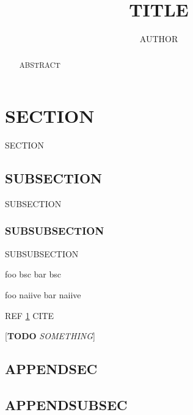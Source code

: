 \documentclass[11pt,twoside]{article}
\author{AUTHOR}
\title{TITLE}
\date{}
\newcommand{\TODO}[1]{[\textbf{TODO} \textsl{#1}]}
\newcommand*{\ShowAbstract}{} %
\newcommand*{\ShowAppendix}{} %
\begin{document}
\sffamily %


\maketitle

\ifdefined\ShowAbstract \begin{abstract}
ABSTRACT
\end{abstract} \fi

\setcounter{tocdepth}{2}
\tableofcontents


\clearpage \section{SECTION} %
\label{sec:SECTION}

SECTION

\subsection{SUBSECTION}
SUBSECTION

\subsubsection{SUBSUBSECTION}
SUBSUBSECTION

foo \gls{bsc}
bar \gls{bsc}

foo \gls{naiive}
bar \gls{naiive}

REF \ref{sec:SECTION}
CITE \cite{Shannon1948}

\TODO{SOMETHING}




\clearpage
{}
\printnoidxglossary[sort=letter]

\clearpage
{}
{} %


\ifdefined\ShowAppendix \begin{appendices} %
    \addappheadtotoc
    \appendixpage

    \section{APPENDSEC}
    \label{appendix:APPENDSEC}

    \subsection{APPENDSUBSEC}\label{appendix:APPENDSUBSEC}
    

\end{appendices} \fi %

\end{document}
